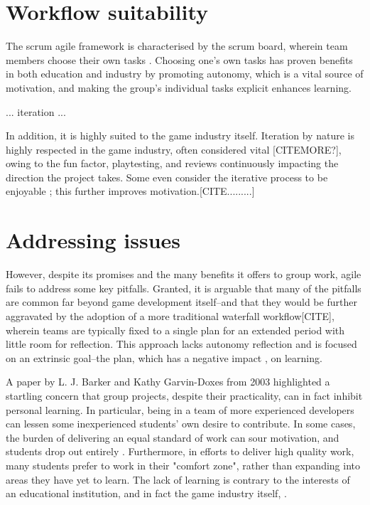 \documentclass{scrartcl}
\begin{document}

\section{Workflow suitability}
The scrum agile framework is characterised by the scrum board, wherein team members choose their own tasks \cite{scrum}. Choosing one's own tasks has proven benefits in both education and industry by promoting autonomy, which is a vital source of motivation, \cite{motivation} and making the group's individual tasks explicit enhances learning. \cite{group2005}

... iteration ...

In addition, it is highly suited to the game industry itself. Iteration by nature is highly respected in the game industry, often considered vital \cite{iteration}[CITEMORE?], owing to the fun factor, playtesting, and reviews continuously impacting the direction the project takes. Some even consider the iterative process to be enjoyable \cite{iteration}; this further improves motivation.[CITE.........]


\section{Addressing issues}
However, despite its promises and the many benefits it offers to group work, agile fails to address some key pitfalls. Granted, it is arguable that many of the pitfalls are common far beyond game development itself--and that they would be further aggravated by the adoption of a more traditional waterfall workflow[CITE], wherein teams are typically fixed to a single plan for an extended period with little room for reflection. This approach lacks autonomy reflection and is focused on an extrinsic goal--the plan, which has a negative impact \cite{motivation}, \cite{learningreflection} on learning.

A paper by L. J. Barker and Kathy Garvin-Doxes from 2003 highlighted a startling concern that group projects, despite their practicality, can in fact inhibit personal learning. In particular, being in a team of more experienced developers can lessen some inexperienced students' own desire to contribute. In some cases, the burden of delivering an equal standard of work can sour motivation, and students drop out entirely \cite{group2003}. Furthermore, in efforts to deliver high quality work, many students prefer to work in their "comfort zone", rather than expanding into areas they have yet to learn.\cite{group2003} \cite{group2005} The lack of learning is contrary to the interests of an educational institution, and in fact the game industry itself\cite{collaboration}, \cite{devstudy}.
\end{document}
